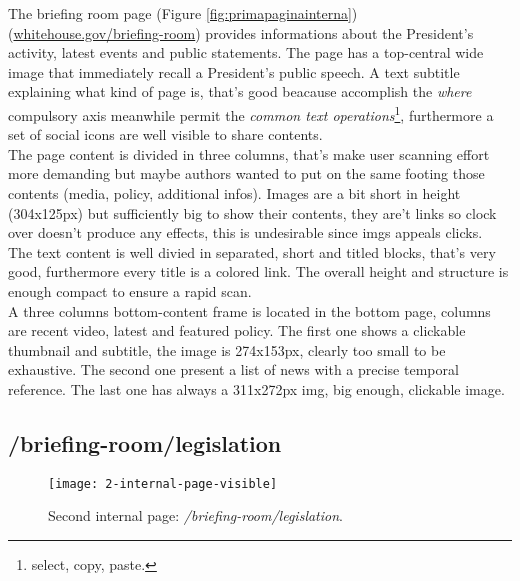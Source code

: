 \documentclass[
10pt, %
a4paper, %
oneside, %
headinclude,footinclude, %
BCOR5mm, %
]{scrartcl}
\begin{document}
	The briefing room page (Figure \ref{fig:primapaginainterna}) (\href{http://www.whitehouse.gov/briefing-room}{whitehouse.gov/briefing-room}) provides informations about the President's activity, latest events and public statements. The page has a top-central wide image that immediately recall a President's public speech. A text subtitle explaining what kind of page is, that's good beacause accomplish the \emph{where} compulsory axis meanwhile permit the \emph{common text operations}\footnote{select, copy, paste.}, furthermore a set of social icons are well visible to share contents. \\
	The page content is divided in three columns, that's make user scanning effort more demanding but maybe authors wanted to put on the same footing those contents (media, policy, additional infos). Images are a bit short in height (304x125px) but sufficiently big to show their contents, they are't links so clock over doesn't produce any effects, this is undesirable since imgs appeals clicks. \\
	The text content is well divied in separated, short and titled blocks, that's very good, furthermore every title is a colored link. The overall height and structure is enough compact to ensure a rapid scan. \\
	A three columns bottom-content frame is located in the bottom page, columns are recent video, latest and featured policy. The first one shows a clickable thumbnail and subtitle, the image is 274x153px, clearly too small to be exhaustive. The second one present a list of news with a precise temporal reference. The last one has always a 311x272px img, big enough, clickable image.

	\subsection{/briefing-room/legislation}
	\label{secondapaginainterna}

	\begin{figure}[h!]
	\centering 
	\centerline{\texttt{[image: 2-internal-page-visible]}}
	\caption[Second internal page: /briefing-room/legislation]{Second internal page: \emph{/briefing-room/legislation}.}
	\label{fig:secondapaginainterna} 
	\end{figure}
\end{document}
